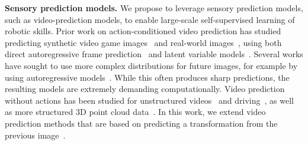 \noindent \textbf{Sensory prediction models.}
We propose to leverage sensory prediction models, such as video-prediction models, to enable large-scale self-supervised learning of robotic skills. Prior work on action-conditioned video prediction has studied predicting synthetic video game images~\cite{atarioh,recurrentsimulators} and real-world images~\cite{bootsetal,finn_nips,video_pixel_networks}, using both direct autoregressive frame prediction~\cite{beyond_mse,finn_nips,video_pixel_networks} and latent variable models~\cite{zhang2018solar,kurutach2018learning}. Several works have sought to use more complex distributions for future images, for example by using autoregressive models~\cite{video_pixel_networks,scott_reed}. 
While this often produces sharp predictions, the resulting models are extremely demanding computationally.
Video prediction without actions has been studied for unstructured videos~\cite{beyond_mse,convlstm,vondrick} and driving~\cite{prednet,dynamic_filter_networks}, as well as more structured 3D point cloud data~\cite{se3}.  In this work, we extend video prediction methods that are based on predicting a transformation from the previous image~\cite{finn_nips,dynamic_filter_networks}. 

